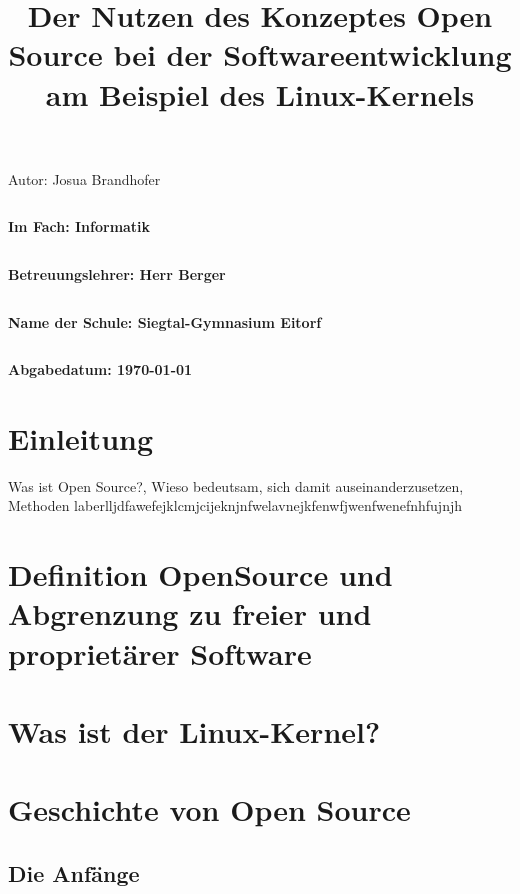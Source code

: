 \documentclass[a4paper,12pt]{article}
\title{Der Nutzen des Konzeptes Open Source bei der Softwareentwicklung am Beispiel des Linux-Kernels}
\date{}
\begin{document}
\maketitle
\thispagestyle{empty}
\begin{center}
  \LARGE Autor:    Josua Brandhofer
\end{center}
\begin{verbatim}
\end{verbatim}
\begin{center}
  \large\textbf{Im Fach:    Informatik}
\end{center}
\begin{verbatim}
\end{verbatim}
\begin{center}
  \large\textbf{Betreuungslehrer:    Herr Berger}
\end{center}
\begin{verbatim}
\end{verbatim}
\begin{center}
  \large\textbf{Name der Schule:    Siegtal-Gymnasium Eitorf}
\end{center}
\begin{verbatim}
\end{verbatim}
\begin{center}
  \large\textbf{Abgabedatum:    \today}
\end{center}

\newpage
{}
\tableofcontents
\newpage
\section{Einleitung}
Was ist Open Source?, Wieso bedeutsam, sich damit auseinanderzusetzen, Methoden laberlljdfawefejklcmjcijeknjnfwelavnejkfenwfjwenfwenefnhfujnjh
\section{Definition OpenSource und Abgrenzung zu freier und proprietärer Software}
\section{Was ist der Linux-Kernel?}
\section{Geschichte von Open Source}
\subsection{Die Anfänge}
\end{document}
